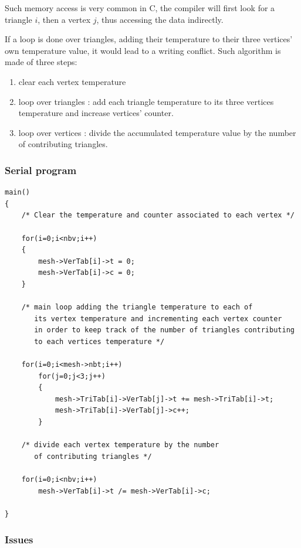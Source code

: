 \documentclass[a4paper,12pt]{article}
\begin{document}
Such memory access is very common in C, the compiler will first look for a triangle $i$, then a vertex $j$, thus accessing the data indirectly.

If a loop is done over triangles, adding their temperature to their three vertices' own temperature value, it would lead to a writing conflict. Such algorithm is made of three steps:

\begin{enumerate}
	\item clear each vertex temperature
	\item loop over triangles : add each triangle temperature to its three vertices temperature and increase vertices' counter.
	\item loop over vertices : divide the accumulated temperature value by the number of contributing triangles.
\end{enumerate}

\subsubsection{Serial program}

\begin{tt}
\begin{verbatim}
main()
{
    /* Clear the temperature and counter associated to each vertex */

    for(i=0;i<nbv;i++)
    {
        mesh->VerTab[i]->t = 0;
        mesh->VerTab[i]->c = 0;
    }

    /* main loop adding the triangle temperature to each of
       its vertex temperature and incrementing each vertex counter
       in order to keep track of the number of triangles contributing
       to each vertices temperature */

    for(i=0;i<mesh->nbt;i++)
        for(j=0;j<3;j++)
        {
            mesh->TriTab[i]->VerTab[j]->t += mesh->TriTab[i]->t;
            mesh->TriTab[i]->VerTab[j]->c++;
        }

    /* divide each vertex temperature by the number
       of contributing triangles */

    for(i=0;i<nbv;i++)
        mesh->VerTab[i]->t /= mesh->VerTab[i]->c;

}
\end{verbatim}
\end{tt}
\normalfont

\subsubsection{Issues}
\end{document}
